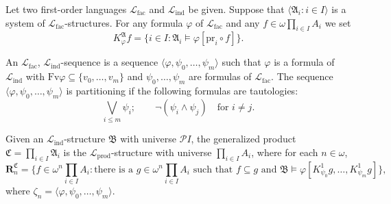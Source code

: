 Let two first-order languages $\mathcal{L}_{\text{fac}}$ and $\mathcal{L}_{\text{ind}}$ be given. Suppose that $\langle \mathfrak{A}_i : i \in I \rangle$ is a system of $\mathcal{L}_{\text{fac}}$-structures. For any formula $\varphi$ of $\mathcal{L}_{\text{fac}}$ and any $f \in \omega \prod_{i \in I} A_i$ we set
$$K_{\varphi}^{\mathfrak{A}} f = \{i \in I : \mathfrak{A}_i \models \varphi [\text{pr}_i \circ f]\}.$$

An $\mathcal{L}_{\text{fac}}$, $\mathcal{L}_{\text{ind}}$-sequence is a sequence $\langle \varphi, \psi_0, \ldots, \psi_m \rangle$ such that $\varphi$ is a formula of $\mathcal{L}_{\text{ind}}$ with $\text{Fv} \varphi \subseteq \{v_0, \ldots, v_m\}$ and $\psi_0, \ldots, \psi_m$ are formulas of $\mathcal{L}_{\text{fac}}$. The sequence $\langle \varphi, \psi_0, \ldots, \psi_m \rangle$ is partitioning if the following formulas are tautologies:
$$\bigvee_{i \leq m} \psi_i; \qquad \neg (\psi_i \wedge \psi_j) \quad \text{for } i \neq j.$$

Given an $\mathcal{L}_{\text{ind}}$-structure $\mathfrak{B}$ with universe $\mathcal{P}I$, the generalized product $\mathfrak{C} = \prod_{i \in I} \mathfrak{A}_i$ is the $\mathcal{L}_{\text{prod}}$-structure with universe $\prod_{i \in I} A_i$, where for each $n \in \omega$,
$$\mathbf{R}_n^{\mathfrak{C}} = \{f \in \omega^n \prod_{i \in I} A_i : \text{there is a } g \in \omega^n \prod_{i \in I} A_i \text{ such that } f \subseteq g \text{ and } \mathfrak{B} \models \varphi[K_{\psi_0}^1 g, \ldots, K_{\psi_m}^1 g]\},$$
where $\zeta_n = \langle \varphi, \psi_0, \ldots, \psi_m \rangle$.
